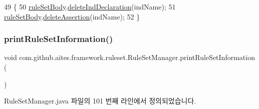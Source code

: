 \begin{DoxyCode}
49                                          \{
50         \mbox{\hyperlink{classcom_1_1github_1_1aites_1_1framework_1_1ruleset_1_1_rule_set_manager_a2218521e8abc1048bd369c7ed1c14c60}{ruleSetBody}}.\mbox{\hyperlink{classcom_1_1github_1_1aites_1_1framework_1_1ruleset_1_1_rule_set_body_a660eccdac94de7432cdb2fee1326c826}{deleteIndDeclaration}}(indName);
51         \mbox{\hyperlink{classcom_1_1github_1_1aites_1_1framework_1_1ruleset_1_1_rule_set_manager_a2218521e8abc1048bd369c7ed1c14c60}{ruleSetBody}}.\mbox{\hyperlink{classcom_1_1github_1_1aites_1_1framework_1_1ruleset_1_1_rule_set_body_a966a05a55349d58f1ca2d56a423f1370}{deleteAssertion}}(indName);
52     \}
\end{DoxyCode}
\mbox{\label{classcom_1_1github_1_1aites_1_1framework_1_1ruleset_1_1_rule_set_manager_a5d1463747adac54f4fd1285e476a7344}} 
\subsubsection{\texorpdfstring{print\+Rule\+Set\+Information()}{printRuleSetInformation()}}
{\footnotesize\ttfamily void com.\+github.\+aites.\+framework.\+ruleset.\+Rule\+Set\+Manager.\+print\+Rule\+Set\+Information (\begin{DoxyParamCaption}{ }\end{DoxyParamCaption})}



Rule\+Set\+Manager.\+java 파일의 101 번째 라인에서 정의되었습니다.


